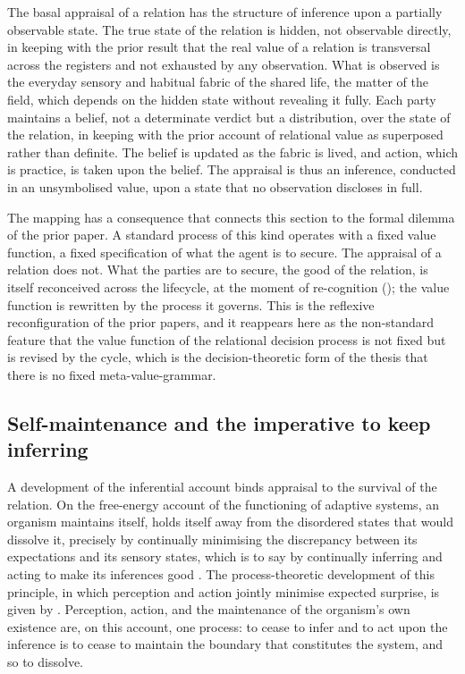 \begin{claim}
The basal appraisal of a relation has the structure of inference upon a partially observable state. The true state of the relation is hidden, not observable directly, in keeping with the prior result that the real value of a relation is transversal across the registers and not exhausted by any observation. What is observed is the everyday sensory and habitual fabric of the shared life, the matter of the field, which depends on the hidden state without revealing it fully. Each party maintains a belief, not a determinate verdict but a distribution, over the state of the relation, in keeping with the prior account of relational value as superposed rather than definite. The belief is updated as the fabric is lived, and action, which is practice, is taken upon the belief. The appraisal is thus an inference, conducted in an unsymbolised value, upon a state that no observation discloses in full.
\end{claim}

\noindent
The mapping has a consequence that connects this section to the formal dilemma of the prior paper. A standard process of this kind operates with a fixed value function, a fixed specification of what the agent is to secure. The appraisal of a relation does not. What the parties are to secure, the good of the relation, is itself reconceived across the lifecycle, at the moment of re-cognition (); the value function is rewritten by the process it governs. This is the reflexive reconfiguration of the prior papers, and it reappears here as the non-standard feature that the value function of the relational decision process is not fixed but is revised by the cycle, which is the decision-theoretic form of the thesis that there is no fixed meta-value-grammar.

\subsection{Self-maintenance and the imperative to keep inferring}
\label{p11:sec:ap-active}

A development of the inferential account binds appraisal to the survival of the relation. On the free-energy account of the functioning of adaptive systems, an organism maintains itself, holds itself away from the disordered states that would dissolve it, precisely by continually minimising the discrepancy between its expectations and its sensory states, which is to say by continually inferring and acting to make its inferences good \parencite{friston2010}. The process-theoretic development of this principle, in which perception and action jointly minimise expected surprise, is given by \textcite{friston2017}. Perception, action, and the maintenance of the organism's own existence are, on this account, one process: to cease to infer and to act upon the inference is to cease to maintain the boundary that constitutes the system, and so to dissolve.

